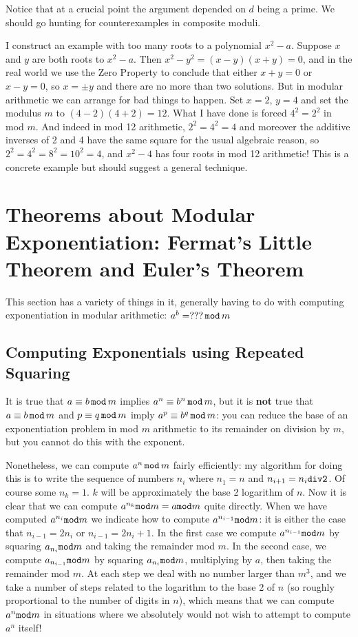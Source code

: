 \documentclass[12pt]{article}
\begin{document}
Notice that at a crucial point the argument depended on $d$ being a prime.   We should go hunting for counterexamples in composite moduli.

I construct an example with too many roots to a polynomial $x^2-a$.   Suppose $x$ and $y$ are both roots to
$x^2-a$.  Then $x^2-y^2=(x-y)(x+y)=0$, and in the real world we use the Zero Property to conclude that either
$x+y=0$ or $x-y=0$, so $x=\pm y$ and there are no more than two solutions.  But in modular arithmetic we can arrange for bad things to happen.   Set $x=2$, $y=4$ and set the modulus $m$ to $(4-2)(4+2)=12$.   What I have done is forced
$4^2=2^2$ in mod $m$.  And indeed in mod 12 arithmetic, $2^2=4^2=4$ and moreover the additive inverses of 2
and 4 have the same square for the usual algebraic reason, so $2^2=4^2=8^2=10^2=4$, and $x^2-4$ has four roots in mod 12 arithmetic!   This is a concrete example but should suggest a general technique.




\section{Theorems about Modular Exponentiation:  Fermat's Little Theorem and Euler's Theorem}

This section has a variety of things in it, generally having to do with computing exponentiation in modular arithmetic:   $a^b=???\,{\tt mod}\,m$

\subsection{Computing Exponentials using Repeated Squaring}

It is true that $a \equiv b\,{\tt mod}\,m$ implies $a^n\equiv b^n\,{\tt mod}\,m$, but it is {\bf not} true that $a\equiv b\,{\tt mod}\,m$ and $p \equiv q\,{\tt mod} \,m$ imply $a^p \equiv b^q\,{\tt mod}\,m$:  you can reduce the base
of an exponentiation problem in mod $m$ arithmetic to its remainder on division by $m$, but you cannot do this with the exponent.

Nonetheless, we can compute $a^n\,{\tt mod}\,m$ fairly efficiently:   my algorithm for doing this is to write the sequence of numbers $n_i$ where $n_1=n$ and $n_{i+1}=n_i{\tt div 2}$.   Of course some $n_k=1$.   $k$ will be approximately the base 2 logarithm of $n$.   Now it is clear that we can compute $a^{n_k}{\tt mod}m=a{\tt mod}m$ quite directly.   When we have computed $a^{n_i}{\tt mod}m$ we indicate how to compute $a^{n_{i-1}}{\tt mod}m$:   it is either the case that $n_{i-1}=2n_i$ or $n_{i-1}=2n_i+1$.
In the first case we compute $a^{n_{i-1}}{\tt mod}m$ by squaring $a_{n_i}{\tt mod}m$ and taking the remainder mod $m$.   In the second case, we compute $a_{n_{i-1}}{\tt mod}m$ by squaring $a_{n_i}{\tt mod}m$, multiplying by $a$, then taking the remainder mod $m$.  At each step we deal with no number larger than $m^3$, and we take a number of steps related to the logarithm to the base 2 of $n$ (so roughly proportional to the number of digits in $n$), which means that we can compute $a^n{\tt mod}m$ in situations where
we absolutely would not wish to attempt to compute $a^n$ itself!
\end{document}
